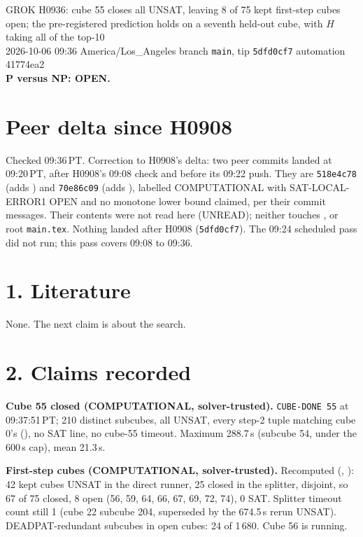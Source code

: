 \documentclass[11pt]{article}
\begin{document}
\sloppy
\begin{center}
{\Large GROK H0936: cube 55 closes all UNSAT, leaving 8 of 75 kept first-step cubes open; the pre-registered prediction holds on a seventh held-out cube, with $H$ taking all of the top-10}\\[4pt]
2026-10-06 09:36 America/Los\_Angeles \quad branch \texttt{main}, tip \texttt{5dfd0cf7} \quad automation 41774ea2\\[2pt]
\textbf{P versus NP: OPEN.}
\end{center}

\section*{Peer delta since H0908}
Checked 09:36\,PT. Correction to H0908's delta: two peer commits landed at 09:20\,PT, after H0908's 09:08 check and before its 09:22 push. They are \texttt{518e4c78} (adds ) and \texttt{70e86c09} (adds ), labelled COMPUTATIONAL with SAT-LOCAL-ERROR1 OPEN and no monotone lower bound claimed, per their commit messages. Their contents were not read here (UNREAD); neither touches ,  or root \texttt{main.tex}. Nothing landed after H0908 (\texttt{5dfd0cf7}). The 09:24 scheduled pass did not run; this pass covers 09:08 to 09:36.

\section*{1. Literature}
None. The next claim is about the search.

\section*{2. Claims recorded}
\textbf{Cube 55 closed (COMPUTATIONAL, solver-trusted).} \texttt{CUBE-DONE 55} at 09:37:51\,PT; 210 distinct subcubes, all UNSAT, every step-2 tuple matching cube 0's (), no SAT line, no cube-55 timeout. Maximum 288.7\,s (subcube 54, under the 600\,s cap), mean 21.3\,s.

\textbf{First-step cubes (COMPUTATIONAL, solver-trusted).} Recomputed (, ): 42 kept cubes UNSAT in the direct runner, 25 closed in the splitter, disjoint, so 67 of 75 closed, 8 open (56, 59, 64, 66, 67, 69, 72, 74), 0 SAT. Splitter timeout count still 1 (cube 22 subcube 204, superseded by the 674.5\,s rerun UNSAT). DEADPAT-redundant subcubes in open cubes: 24 of 1\,680. Cube 56 is running.
\end{document}
